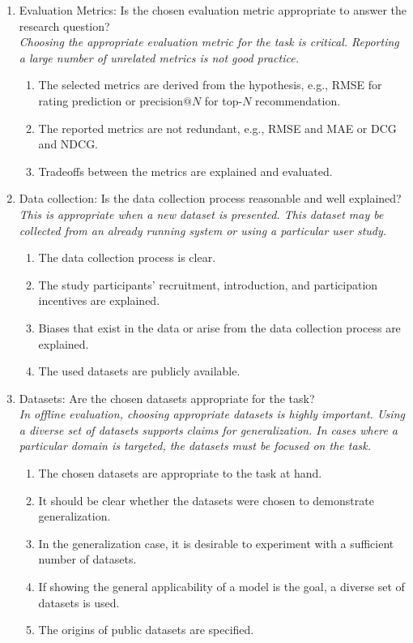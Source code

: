 \begin{enumerate}
    \item Evaluation Metrics: Is the chosen evaluation metric appropriate to answer the research question? \\
    \emph{Choosing the appropriate evaluation metric for the task is critical. Reporting a large number of unrelated metrics is not good practice.}
    \begin{enumerate}[label*=\arabic*.]
        \item The selected metrics are derived from the hypothesis, e.g., RMSE for rating prediction or precision$@N$ for top-$N$ recommendation. 
        \item The reported metrics are not redundant, e.g., RMSE and MAE or DCG and NDCG.
        \item Tradeoffs between the metrics are explained and evaluated.
    \end{enumerate}

    \item Data collection:
    Is the data collection process reasonable and well explained?\\ 
    \emph{This is appropriate when a new dataset is presented. This dataset may be collected from an already running system or using a particular user study.}
    \begin{enumerate} [label*=\arabic*.]
       \item The data collection process is clear.
        \item The study participants' recruitment, introduction, and participation incentives are explained.
        \item Biases that exist in the data or arise from the data collection process are explained.
        \item The used datasets are publicly available.
    \end{enumerate}

    \item Datasets: Are the chosen datasets appropriate for the task? \\
    \emph{In offline evaluation, choosing appropriate datasets is highly important. Using a diverse set of datasets supports claims for generalization. In cases where a particular domain is targeted, the datasets must be focused on the task.}
    \begin{enumerate} [label*=\arabic*.]
        \item The chosen datasets are appropriate to the task at hand.
        \item It should be clear whether the datasets were chosen to demonstrate generalization.
        \item In the generalization case, it is desirable to experiment with a sufficient number of datasets. %
        \item If showing the general applicability of a model is the goal, a diverse set of datasets is used.
        \item The origins of public datasets are specified.
    \end{enumerate}


\end{enumerate}
